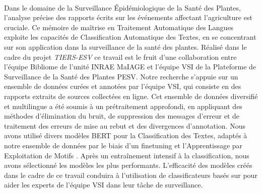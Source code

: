 \\[20pt]

Dans le domaine de la Surveillance \'Epid\'emiologique de la Sant\'e des Plantes, l'analyse pr\'ecise des rapports \'ecrits sur les \'ev\'enements affectant l'agriculture est cruciale. 
Ce m\'emoire de ma\^itrise en Traitement Automatique des Langues exploite les capacit\'es de Classification Automatique des Textes, en se concentrant sur son application dans la surveillance de la sant\'e des plantes. R\'ealis\'e dans le cadre du projet \emph{TIERS-ESV} ce travail est le fruit d'une collaboration entre l'\'equipe Bibliome de l'unit\'e INRAE MaIAGE et l'\'equipe VSI de la Plateforme de Surveillance de la Sant\'e des Plantes PESV. Notre recherche s'appuie sur un ensemble de donn\'ees cur\'ees et annot\'ees par l'\'equipe VSI, qui consiste en des rapports extraits de sources collect\'ees en ligne. Cet ensemble de donn\'ees diversifi\'e et multilingue a \'et\'e soumis \`a un pr\'etraitement approfondi, en appliquant des m\'ethodes d'\'elimination du bruit, de suppression des messages d'erreur et de traitement des erreurs de mise au rebut et des divergences d'annotation. Nous avons utilis\'e divers mod\`eles BERT pour la Classification des Textes, adapt\'es \`a notre ensemble de donn\'ees par le biais d'un finetuning et l'Apprentissage par Exploitation de Motifs . 
Apr\`es un entra\^inement intensif \`a la classification, nous avons s\'electionn\'e les mod\`eles les plus performants. 
L'efficacit\'e des mod\`eles cr\'e\'es dans le cadre de ce travail conduira \`a l'utilisation de classificateurs bas\'es sur \BERT{} pour aider les experts de l'\'equipe VSI dans leur tâche de surveillance.

